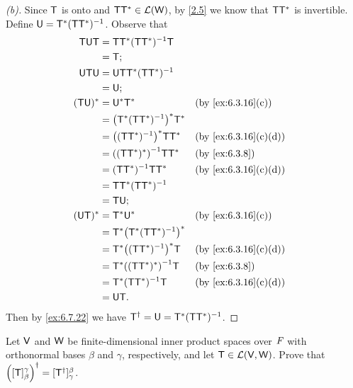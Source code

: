 \begin{proof}[(b)]
  Since \(\mathsf{T}\) is onto and \(\mathsf{T} \mathsf{T}^* \in \mathcal{L}(\mathsf{W})\), by \cref{2.5} we know that \(\mathsf{T} \mathsf{T}^*\) is invertible.
  Define \(\mathsf{U} = \mathsf{T}^* (\mathsf{T} \mathsf{T}^*)^{-1}\).
  Observe that
  \begin{align*}
    \T \U \T  & = \T \T^* (\T \T^*)^{-1} \T                                \\
              & = \T;                                                      \\
    \U \T \U  & = \U \T \T^* (\T \T^*)^{-1}                                \\
              & = \U;                                                      \\
    (\T \U)^* & = \U^* \T^*                       &  & \by{ex:6.3.16}[c]   \\
              & = \pa{\T^* (\T \T^*)^{-1}}^* \T^*                          \\
              & = \pa{(\T \T^*)^{-1}}^* \T \T^*   &  & \by{ex:6.3.16}[c,d] \\
              & = \pa{(\T \T^*)^*}^{-1} \T \T^*   &  & \by{ex:6.3.8}       \\
              & = (\T \T^*)^{-1} \T \T^*          &  & \by{ex:6.3.16}[c,d] \\
              & = \T \T^* (\T \T^*)^{-1}                                   \\
              & = \T \U;                                                   \\
    (\U \T)^* & = \T^* \U^*                       &  & \by{ex:6.3.16}[c]   \\
              & = \T^* \pa{\T^* (\T \T^*)^{-1}}^*                          \\
              & = \T^* \pa{(\T \T^*)^{-1}}^* \T   &  & \by{ex:6.3.16}[c,d] \\
              & = \T^* \pa{(\T \T^*)^*}^{-1} \T   &  & \by{ex:6.3.8}       \\
              & = \T^* (\T \T^*)^{-1} \T          &  & \by{ex:6.3.16}[c,d] \\
              & = \U \T.
  \end{align*}
  Then by \cref{ex:6.7.22} we have \(\mathsf{T}^{\dag} = \mathsf{U} = \mathsf{T}^* (\mathsf{T} \mathsf{T}^*)^{-1}\).
\end{proof}

\begin{ex}\label{ex:6.7.26}
  Let \(\mathsf{V}\) and \(\mathsf{W}\) be finite-dimensional inner product spaces over \(\mathit{F}\) with orthonormal bases \(\beta\) and \(\gamma\), respectively, and let \(\mathsf{T} \in \mathcal{L}(\mathsf{V}, \mathsf{W})\).
  Prove that \(\left\lparen[\mathsf{T}]_{\beta}^{\gamma}\right\rparen^{\dag} = [\mathsf{T}^{\dag}]_{\gamma}^{\beta}\).
\end{ex}

